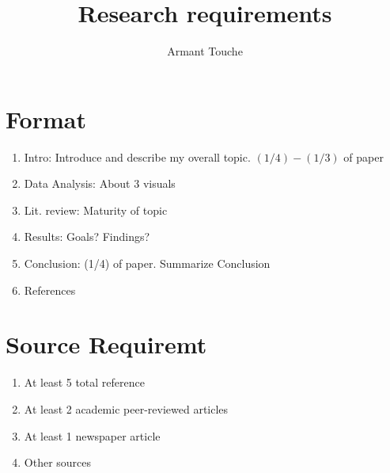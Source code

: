 \documentclass{article}
\begin{document}
\title{\vspace{-2cm}Research requirements}
\author{Armant Touche}
\maketitle

\section{Format}
    \begin{enumerate}
        \item Intro: Introduce and describe my overall topic. $(1/4) - (1/3)$ of paper
        \item Data Analysis: About 3 visuals 
        \item Lit. review: Maturity of topic
        \item Results: Goals? Findings?
        \item Conclusion: (1/4) of paper. Summarize Conclusion
        \item References

    \end{enumerate}

\section{Source Requiremt}
    \begin{enumerate}
        \item At least 5 total reference
        \item At least 2 academic peer-reviewed articles
        \item At least 1 newspaper article
        \item Other sources

    \end{enumerate}
\end{document}
